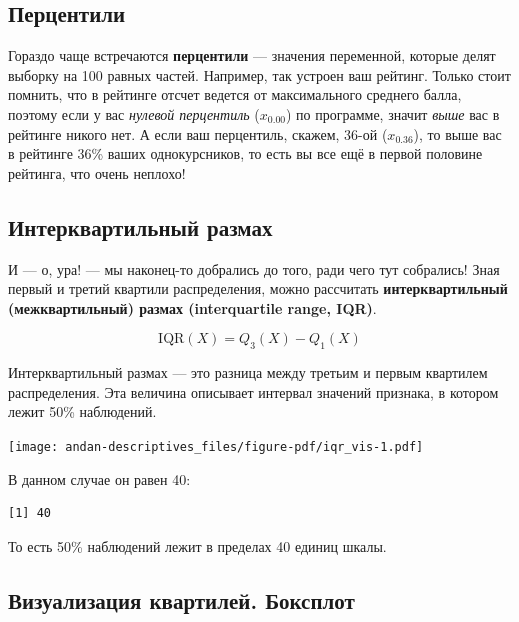 \documentclass[
  letterpaper,
  DIV=11,
  numbers=noendperiod]{scrreprt}
\newenvironment{Shaded}{}{}
\newcommand{\FunctionTok}[1]{\textcolor[rgb]{0.44,0.26,0.76}{#1}}
\newcommand{\NormalTok}[1]{\textcolor[rgb]{0.14,0.16,0.18}{#1}}
\newcommand{\SpecialCharTok}[1]{\textcolor[rgb]{0.00,0.36,0.77}{#1}}
\theoremstyle{definition}
\theoremstyle{remark}
\begin{document}
\subsection{Перцентили}\label{percentiles}

Гораздо чаще встречаются \textbf{перцентили} --- значения переменной,
которые делят выборку на 100 равных частей. Например, так устроен ваш
рейтинг. Только стоит помнить, что в рейтинге отсчет ведется от
максимального среднего балла, поэтому если у вас \emph{нулевой
перцентиль} (\(x_{0.00}\)) по программе, значит \emph{выше} вас в
рейтинге никого нет. А если ваш перцентиль, скажем, 36-ой
(\(x_{0.36}\)), то выше вас в рейтинге 36\% ваших однокурсников, то есть
вы все ещё в первой половине рейтинга, что очень неплохо!

\subsection{Интерквартильный размах}\label{iqr}

И --- о, ура! --- мы наконец-то добрались до того, ради чего тут
собрались! Зная первый и третий квартили распределения, можно рассчитать
\textbf{интерквартильный (межквартильный) размах (interquartile range,
IQR)}.

\[
\mathrm{IQR}(X) = Q_3(X) - Q_1(X)
\]

Интерквартильный размах --- это разница между третьим и первым квартилем
распределения. Эта величина описывает интервал значений признака, в
котором лежит 50\% наблюдений.

\texttt{[image: andan-descriptives\_files/figure-pdf/iqr\_vis-1.pdf]}

В данном случае он равен 40:

\begin{Shaded}
\end{Shaded}

\begin{verbatim}
[1] 40
\end{verbatim}

То есть 50\% наблюдений лежит в пределах 40 единиц шкалы.

\subsection{Визуализация квартилей. Боксплот}\label{boxplot}
\end{document}
